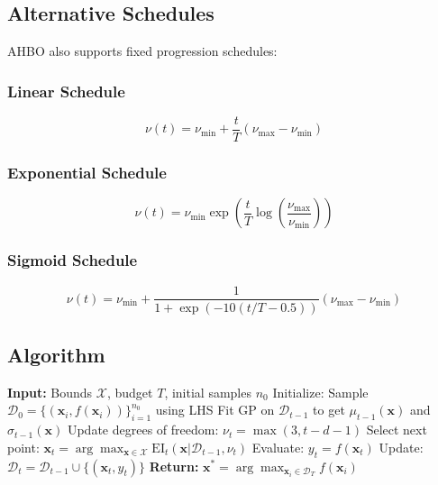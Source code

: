 \documentclass[11pt,a4paper]{article}
\begin{document}
\subsection{Alternative Schedules}

AHBO also supports fixed progression schedules:

\subsubsection{Linear Schedule}
\begin{equation}
    \nu(t) = \nu_{\min} + \frac{t}{T}(\nu_{\max} - \nu_{\min})
\end{equation}

\subsubsection{Exponential Schedule}
\begin{equation}
    \nu(t) = \nu_{\min} \exp\left(\frac{t}{T} \log\left(\frac{\nu_{\max}}{\nu_{\min}}\right)\right)
\end{equation}

\subsubsection{Sigmoid Schedule}
\begin{equation}
    \nu(t) = \nu_{\min} + \frac{1}{1 + \exp(-10(t/T - 0.5))}(\nu_{\max} - \nu_{\min})
\end{equation}

\subsection{Algorithm}

\begin{algorithm}[H]
\caption{Adaptive Hybrid Bayesian Optimization}
\begin{algorithmic}[1]
\State \textbf{Input:} Bounds $\mathcal{X}$, budget $T$, initial samples $n_0$
\State Initialize: Sample $\mathcal{D}_0 = \{(\mathbf{x}_i, f(\mathbf{x}_i))\}_{i=1}^{n_0}$ using LHS
    \State Fit GP on $\mathcal{D}_{t-1}$ to get $\mu_{t-1}(\mathbf{x})$ and $\sigma_{t-1}(\mathbf{x})$
    \State Update degrees of freedom: $\nu_t = \max(3, t - d - 1)$
    \State Select next point: $\mathbf{x}_t = \arg\max_{\mathbf{x} \in \mathcal{X}} \text{EI}_t(\mathbf{x} | \mathcal{D}_{t-1}, \nu_t)$
    \State Evaluate: $y_t = f(\mathbf{x}_t)$
    \State Update: $\mathcal{D}_t = \mathcal{D}_{t-1} \cup \{(\mathbf{x}_t, y_t)\}$
\EndFor
\State \textbf{Return:} $\mathbf{x}^* = \arg\max_{\mathbf{x}_i \in \mathcal{D}_T} f(\mathbf{x}_i)$
\end{algorithmic}
\end{algorithm}
\end{document}
